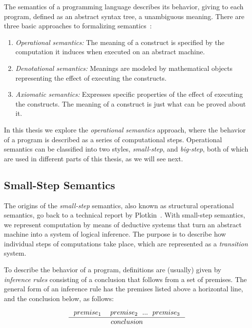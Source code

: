 \documentclass[tese,capa,english]{texufpel}
\begin{document}
The semantics of a programming language describes its behavior, giving to each program, defined as an abstract syntax tree, a unambiguous meaning. There are three basic approaches to formalizing semantics~\cite{Nielson:2007:SAA:1296072}:

\begin{enumerate}
\item \emph{Operational semantics:} The meaning of a construct is specified by the computation it induces when executed on an abstract machine. 
\item \emph{Denotational semantics:} Meanings are modeled by mathematical objects representing the effect of executing the constructs.
\item \emph{Axiomatic semantics:} Expresses specific properties of the effect of executing the constructs. The meaning of a construct is just what can be proved about it.
\end{enumerate}

In this thesis we explore the \emph{operational semantics} approach, where the behavior of a program is described as a series of computational steps. Operational semantics can be classified into two styles, \emph{small-step}, and \emph{big-step}, both of which are used in different parts of this thesis, as we will see next.

\subsection{Small-Step Semantics}

The origins of the \emph{small-step} semantics, also known as structural operational semantics, go back to a technical report by Plotkin~\cite{plotkin1981structural}. With small-step semantics, we represent computation by means of deductive systems that turn an abstract machine into a system of logical inference. The purpose is to describe how individual steps of computations take place, which are represented as a \emph{transition} system. 

To describe the behavior of a program, definitions are (usually) given by \emph{inference rules} consisting of a conclusion that follows from a set of premises. The general form of an inference rule has the premises listed above a horizontal line, and the conclusion below, as follows:

\begin{figure}[!htb]
\[
  \inference{premise_1 \ \ \ \ premise_2 \ \ ... \ \ premise_3}
            {conclusion}
\]
\end{figure}
\end{document}

